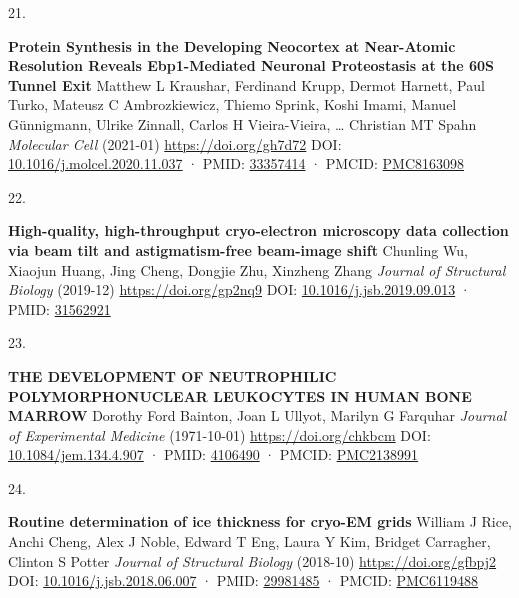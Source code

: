 \documentclass[
]{article}
\newlength{\cslhangindent}
\newlength{\csllabelwidth}
\newlength{\cslentryspacingunit} %
\newenvironment{CSLReferences}[2] %
 {%
  \setlength{\parindent}{0pt}
  \ifodd #1
  \let\oldpar\par
  \def\par{\hangindent=\cslhangindent\oldpar}
  \fi
  \setlength{\parskip}{#2\cslentryspacingunit}
 }%
 {}
\newcommand{\CSLBlock}[1]{#1\hfill\break}
\newcommand{\CSLLeftMargin}[1]{\parbox[t]{\csllabelwidth}{#1}}
\newcommand{\CSLRightInline}[1]{\parbox[t]{\linewidth - \csllabelwidth}{#1}\break}
\begin{document}
\begin{CSLReferences}{0}{0}
\leavevmode{}%
\CSLLeftMargin{21. }%
\CSLRightInline{\textbf{Protein Synthesis in the Developing Neocortex at Near-Atomic Resolution Reveals Ebp1-Mediated Neuronal Proteostasis at the 60S Tunnel Exit}
\CSLBlock{Matthew L Kraushar, Ferdinand Krupp, Dermot Harnett, Paul Turko, Mateusz C Ambrozkiewicz, Thiemo Sprink, Koshi Imami, Manuel Günnigmann, Ulrike Zinnall, Carlos H Vieira-Vieira, \ldots{} Christian MT Spahn} \emph{Molecular Cell} (2021-01) \url{https://doi.org/gh7d72}
\CSLBlock{DOI: \href{https://doi.org/10.1016/j.molcel.2020.11.037}{10.1016/j.molcel.2020.11.037} · PMID: \href{https://www.ncbi.nlm.nih.gov/pubmed/33357414}{33357414} · PMCID: \href{https://www.ncbi.nlm.nih.gov/pmc/articles/PMC8163098}{PMC8163098}}}

\leavevmode{}%
\CSLLeftMargin{22. }%
\CSLRightInline{\textbf{High-quality, high-throughput cryo-electron microscopy data collection via beam tilt and astigmatism-free beam-image shift}
\CSLBlock{Chunling Wu, Xiaojun Huang, Jing Cheng, Dongjie Zhu, Xinzheng Zhang} \emph{Journal of Structural Biology} (2019-12) \url{https://doi.org/gp2nq9}
\CSLBlock{DOI: \href{https://doi.org/10.1016/j.jsb.2019.09.013}{10.1016/j.jsb.2019.09.013} · PMID: \href{https://www.ncbi.nlm.nih.gov/pubmed/31562921}{31562921}}}

\leavevmode{}%
\CSLLeftMargin{23. }%
\CSLRightInline{\textbf{THE DEVELOPMENT OF NEUTROPHILIC POLYMORPHONUCLEAR LEUKOCYTES IN HUMAN BONE MARROW}
\CSLBlock{Dorothy Ford Bainton, Joan L Ullyot, Marilyn G Farquhar} \emph{Journal of Experimental Medicine} (1971-10-01) \url{https://doi.org/chkbcm}
\CSLBlock{DOI: \href{https://doi.org/10.1084/jem.134.4.907}{10.1084/jem.134.4.907} · PMID: \href{https://www.ncbi.nlm.nih.gov/pubmed/4106490}{4106490} · PMCID: \href{https://www.ncbi.nlm.nih.gov/pmc/articles/PMC2138991}{PMC2138991}}}

\leavevmode{}%
\CSLLeftMargin{24. }%
\CSLRightInline{\textbf{Routine determination of ice thickness for cryo-EM grids}
\CSLBlock{William J Rice, Anchi Cheng, Alex J Noble, Edward T Eng, Laura Y Kim, Bridget Carragher, Clinton S Potter} \emph{Journal of Structural Biology} (2018-10) \url{https://doi.org/gfbpj2}
\CSLBlock{DOI: \href{https://doi.org/10.1016/j.jsb.2018.06.007}{10.1016/j.jsb.2018.06.007} · PMID: \href{https://www.ncbi.nlm.nih.gov/pubmed/29981485}{29981485} · PMCID: \href{https://www.ncbi.nlm.nih.gov/pmc/articles/PMC6119488}{PMC6119488}}}


\end{CSLReferences}
\end{document}
